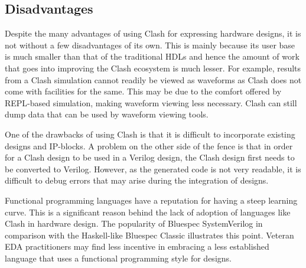 

\subsection{Disadvantages}
Despite the many advantages of using Clash for expressing hardware
designs, it is not without a few disadvantages of its own.
This is mainly because its user base is much smaller than that of the
traditional \glspl{HDL} and hence the amount of work that goes into
improving the Clash ecosystem is much lesser.
For example, results from a Clash simulation cannot readily be viewed
as waveforms as Clash does not come with facilities for the same.
This may be due to the comfort offered by \gls{REPL}-based
simulation, making waveform viewing less necessary.
Clash can still dump data that can be used by waveform viewing tools.

One of the drawbacks of using Clash is that it is difficult to
incorporate existing designs and \gls{IP}-blocks.
A problem on the other side of the fence is that in order for a Clash
design to be used in a Verilog design, the Clash design first needs to
be converted to Verilog.
However, as the generated code is not very readable, it is difficult
to debug errors that may arise during the integration of designs.

Functional programming languages have a reputation for having a
steep learning curve.
This is a significant reason behind the lack of adoption of languages
like Clash in hardware design.
The popularity of Bluespec SystemVerilog in comparison with the
Haskell-like Bluespec Classic illustrates this point.
Veteran \gls{EDA} practitioners may find less incentive in embracing a
less established language that uses a functional programming style for
designs.

